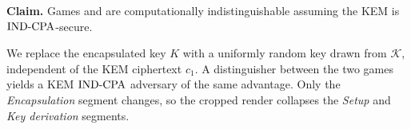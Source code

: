 \textbf{Claim.}
  Games  and  are computationally
  indistinguishable assuming the KEM is $\mathrm{IND\text{-}CPA}$-secure.

We replace the encapsulated key $K$ with a uniformly random key drawn from
$\mathcal{K}$, independent of the KEM ciphertext $c_1$. A distinguisher between
the two games yields a KEM $\mathrm{IND\text{-}CPA}$ adversary of the same advantage. Only the
\emph{Encapsulation} segment changes, so the cropped render collapses the
\emph{Setup} and \emph{Key derivation} segments.
